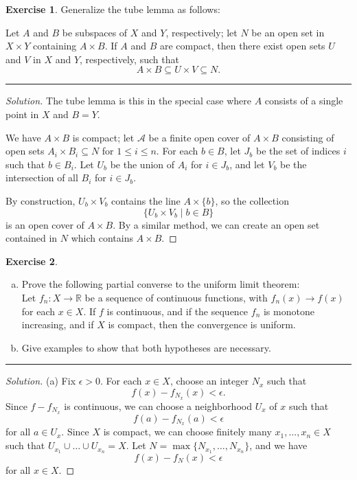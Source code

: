 \documentclass{article}
\theoremstyle{definition}
\newtheorem{exercise}{Exercise}[section]
\begin{document}
\pagebreak

\begin{exercise}
  Generalize the tube lemma as follows:
  
  Let $A$ and $B$ be subspaces of $X$ and $Y$, respectively; let $N$ be an open set in $X\times Y$ containing $A\times B$. If $A$ and $B$ are compact, then there exist open sets $U$ and $V$ in $X$ and $Y$, respectively, such that
  $$A\times B\subseteq U\times V\subseteq N.$$
\end{exercise}
\hrule
\begin{proof}[Solution]
  The tube lemma is this in the special case where $A$ consists of a single point in $X$ and $B = Y$.

  We have $A\times B$ is compact; let $\mathcal{A}$ be a finite open cover of $A\times B$ consisting of open sets $A_i\times B_i\subseteq N$ for $1\le i\le n$. For each $b\in B$, let $J_b$ be the set of indices $i$ such that $b\in B_i$. Let $U_b$ be the union of $A_i$ for $i\in J_b$, and let $V_b$ be the intersection of all $B_i$ for $i\in J_b$.

  By construction, $U_b\times V_b$ contains the line $A\times\{b\}$, so the collection $$\{U_b\times V_b\mid b\in B\}$$ is an open cover of $A\times B$. By a similar method, we can create an open set contained in $N$ which contains $A\times B$.
\end{proof}

\pagebreak

\begin{exercise}
  \begin{enumerate}[(a)]
    \item Prove the following partial converse to the uniform limit theorem:\\
    Let $f_n:X\to\mathbb{R}$ be a sequence of continuous functions, with $f_n(x)\to f(x)$ for each $x\in X$. If $f$ is continuous, and if the sequence $f_n$ is monotone increasing, and if $X$ is compact, then the convergence is uniform.
    \item Give examples to show that both hypotheses are necessary.
  \end{enumerate}
\end{exercise}
\hrule
\begin{proof}[Solution]
  (a) Fix $\epsilon > 0$. For each $x\in X$, choose an integer $N_x$ such that
  $$f(x) - f_{N_x}(x) < \epsilon.$$
  Since $f - f_{N_x}$ is continuous, we can choose a neighborhood $U_x$ of $x$ such that
  $$f(a)-f_{N_x}(a) < \epsilon$$
  for all $a\in U_x$. Since $X$ is compact, we can choose finitely many $x_1,\dots,x_n\in X$ such that $U_{x_1}\cup\dots\cup U_{x_n} = X$. Let $N = \max\{N_{x_1},\dots,N_{x_n}\}$, and we have $$f(x) - f_N(x) < \epsilon$$ for all $x\in X$.
\end{proof}
\end{document}
